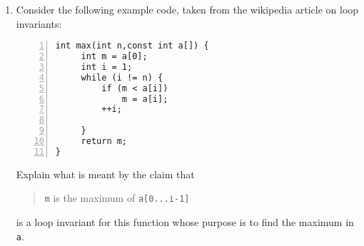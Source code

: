 \documentclass[11pt,a4paper]{scrartcl}
\newif\ifanswers
\begin{document}
\begin{enumerate}
\item Consider the following example code, taken from the wikipedia article on loop invariants:
\begin{lstlisting}[numbers=left]
int max(int n,const int a[]) {
     int m = a[0];
     int i = 1;
     while (i != n) {
         if (m < a[i])
             m = a[i];
         ++i;

     }
     return m;
}
\end{lstlisting}
Explain what is meant by the claim that 
\begin{quote}
\texttt{m} is the maximum
of \texttt{a[0...i-1]} 
\end{quote}
is a loop invariant for this function whose purpose is to find the
maximum in \texttt{a}.

\ifanswers

\noindent Solution: the statement is true at the start in line 3
because \texttt{i=1} and \texttt{m=a[0]} which is trivially the
maximum; if the statement is true at the start
of the loop then the new element is bigger than all the previous ones, in which \texttt{m} is set equal the new element, or the maximum remains the same, either way the invariant remains true at the end and if it is true when \texttt{i=n} then the algorithm has succeeded.
\fi


\end{enumerate}
\end{document}
